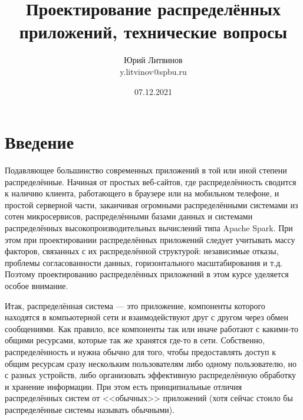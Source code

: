 \documentclass[a5paper]{article}
\title{Проектирование распределённых приложений, технические вопросы}
\author{Юрий Литвинов\\\small{y.litvinov@spbu.ru}}
\date{07.12.2021}
\begin{document}
\maketitle
\thispagestyle{empty}

\section{Введение}

Подавляющее большинство современных приложений в той или иной степени распределённые. Начиная от простых веб-сайтов, где распределённость сводится к наличию клиента, работающего в браузере или на мобильном телефоне, и простой серверной части, заканчивая огромными распределёнными системами из сотен микросервисов, распределёнными базами данных и системами распределённых высокопроизводительных вычислений типа Apache Spark. При этом при проектировании распределённых приложений следует учитывать массу факторов, связанных с их распределённой структурой: независимые отказы, проблемы согласованности данных, горизонтального масштабирования и т.д. Поэтому проектированию распределённых приложений в этом курсе уделяется особое внимание.

Итак, распределённая система --- это приложение, компоненты которого находятся в компьютерной сети и взаимодействуют друг с другом через обмен сообщениями. Как правило, все компоненты так или иначе работают с какими-то общими ресурсами, которые так же хранятся где-то в сети. Собственно, распределённость и нужна обычно для того, чтобы предоставлять доступ к общим ресурсам сразу нескольким пользователям либо одному пользователю, но с разных устройств, либо организовать эффективную распределённую обработку и хранение информации. При этом есть принципиальные отличия распределённых систем от <<обычных>> приложений (хотя сейчас стоило бы распределённые системы называть обычными).
\end{document}
